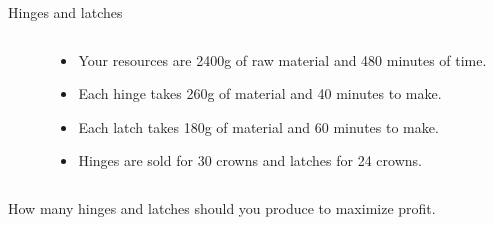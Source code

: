\begin{frame}{Hinges and latches}
\begin{columns}
\begin{column}{0.4\linewidth}
 \end{column}
 \begin{column}{0.5\linewidth}
  \begin{itemize}
\pause\item Your resources are 2400g of raw material and 480 minutes of time.

\pause\item Each hinge takes 260g of material and 40 minutes to make.

\pause \item Each latch takes 180g of material and 60 minutes to make.

\pause \item Hinges are sold for 30 crowns and latches for 24 crowns.
  \end{itemize}
 \end{column}
\end{columns}
\pause \vspace{20pt}

How many hinges and latches should you produce to maximize profit. 

\end{frame}

